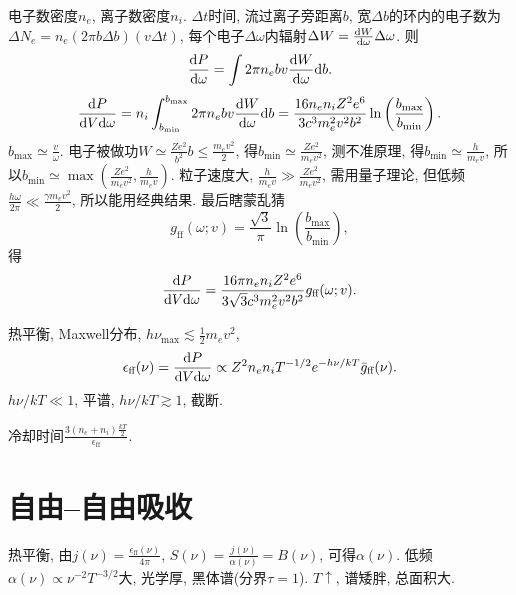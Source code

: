 电子数密度$n_e$, 离子数密度$n_i$. $\Delta t$时间, 流过离子旁距离$b$, 宽$\Delta b$的环内的电子数为$\Delta N_e=n_e(2\pi b\Delta b)(v\Delta t)$, 每个电子$\Delta\omega$内辐射$\Delta W=\frac{\mathrm{d} W}{\mathrm{d}\omega}\Delta\omega$. 则
\begin{equation}
    \frac{\mathrm{d} P}{\mathrm{d} \omega}=\int 2\pi n_e bv\frac{\mathrm{d} W}{\mathrm{d}\omega}\mathrm{d} b.
\end{equation}
\begin{equation}
    \frac{\mathrm{d} P}{\mathrm{d} V\mathrm{d} \omega}=n_i\int_{b_\text{min}}^{b_\text{max}} 2\pi n_e bv\frac{\mathrm{d} W}{\mathrm{d}\omega}\mathrm{d} b=\frac{16n_en_iZ^2e^6}{3c^3m_e^2v^2b^2}\ln\left(\frac{b_\text{max}}{b_\text{min}}\right).
\end{equation}
$b_\text{max}\simeq\frac{v}{\omega}$. 电子被做功$W\simeq\frac{Ze^2}{b^2}b\leqslant\frac{m_ev^2}{2}$, 得$b_\text{min}\simeq\frac{Ze^2}{m_ev^2}$, 测不准原理, 得$b_\text{min}\simeq\frac{h}{m_ev}$, 所以$b_\text{min}\simeq\max\left(\frac{Ze^2}{m_ev^2},\frac{h}{m_ev}\right)$. 粒子速度大, $\frac{h}{m_ev}\gg\frac{Ze^2}{m_ev^2}$, 需用量子理论, 但低频$\frac{h\omega}{2\pi}\ll\frac{\gamma m_ev^2}{2}$, 所以能用经典结果. 最后瞎蒙乱猜
\begin{equation}
    g_\text{ff}(\omega;v)=\frac{\sqrt{3}}{\pi}\ln\left(\frac{b_\text{max}}{b_\text{min}}\right),
\end{equation}
得
\begin{equation}
    \frac{\mathrm{d} P}{\mathrm{d} V\mathrm{d} \omega}=\frac{16\pi n_en_iZ^2e^6}{3\sqrt{3}c^3m_e^2v^2b^2}g_\text{ff}(\omega;v).
\end{equation}

热平衡, Maxwell分布, $h\nu_\text{max}\lesssim\frac{1}{2}m_ev^2$,
\begin{equation}
    \epsilon_\text{ff}(\nu)=\frac{\mathrm{d} P}{\mathrm{d} V\mathrm{d} \omega}\propto Z^2n_en_iT^{-1/2}e^{-h\nu/kT}\bar{g}_\text{ff}(\nu).
\end{equation}
$h\nu/kT\ll1$, 平谱, $h\nu/kT\gtrsim1$, 截断.

冷却时间$\frac{3(n_e+n_i)\frac{kT}{2}}{\epsilon_\text{ff}}$.

\section{自由--自由吸收}

热平衡, 由$j(\nu)=\frac{\epsilon_\text{ff}(\nu)}{4\pi}$, $S(\nu)=\frac{j(\nu)}{\alpha(\nu)}=B(\nu)$, 可得$\alpha(\nu)$. 低频$\alpha(\nu)\propto \nu^{-2}T^{-3/2}$大, 光学厚, 黑体谱(分界$\tau=1$). $T\uparrow$, 谱矮胖, 总面积大.
